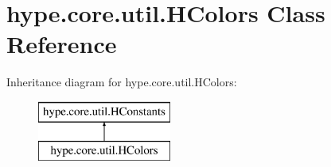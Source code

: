 \hypertarget{classhype_1_1core_1_1util_1_1_h_colors}{\section{hype.\-core.\-util.\-H\-Colors Class Reference}
\label{classhype_1_1core_1_1util_1_1_h_colors}
}
Inheritance diagram for hype.\-core.\-util.\-H\-Colors\-:\begin{figure}[H]
\begin{center}
\leavevmode
\includegraphics[height=2.000000cm]{classhype_1_1core_1_1util_1_1_h_colors}
\end{center}
\end{figure}
